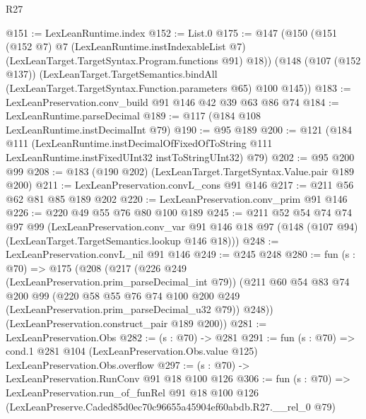 \begin{lexlean}{R27}
\begin{coremodule}
@151 := LexLeanRuntime.index
@152 := List.{0}
@175 := @147
    (@150
      (@151
        (@152 @7)
        @7
        (LexLeanRuntime.instIndexableList @7)
        (LexLeanTarget.TargetSyntax.Program.functions @91)
        @18))
    (@148
      (@107 (@152 @137))
      (LexLeanTarget.TargetSemantics.bindAll
        (LexLeanTarget.TargetSyntax.Function.parameters @65)
        @100
        @145))
@183 := LexLeanPreservation.conv_build @91 @146 @42 @39 @63 @86 @74
@184 := LexLeanRuntime.parseDecimal
@189 := @117 (@184 @108 LexLeanRuntime.instDecimalInt @79)
@190 := @95 @189
@200 := @121
    (@184
      @111
      (LexLeanRuntime.instDecimalOfFixedOfToString
        @111
        LexLeanRuntime.instFixedUInt32
        instToStringUInt32)
      @79)
@202 := @95 @200 @99
@208 := @183 (@190 @202) (LexLeanTarget.TargetSyntax.Value.pair @189 @200)
@211 := LexLeanPreservation.convL_cons @91 @146
@217 := @211 @56 @62 @81 @85 @189 @202
@220 := LexLeanPreservation.conv_prim @91 @146
@226 := @220 @49 @55 @76 @80 @100 @189
@245 := @211
    @52
    @54
    @74
    @74
    @97
    @99
    (LexLeanPreservation.conv_var
      @91
      @146
      @18
      @97
      (@148 (@107 @94) (LexLeanTarget.TargetSemantics.lookup @146 @18)))
@248 := LexLeanPreservation.convL_nil @91 @146
@249 := @245 @248
@280 := fun (s : @70) =>
  @175
    (@208
      (@217
        (@226 @249 (LexLeanPreservation.prim_parseDecimal_int @79))
        (@211
          @60
          @54
          @83
          @74
          @200
          @99
          (@220 @58 @55 @76 @74 @100 @200 @249 (LexLeanPreservation.prim_parseDecimal_u32 @79))
          @248))
      (LexLeanPreservation.construct_pair @189 @200))
@281 := LexLeanPreservation.Obs
@282 := (s : @70) -> @281
@291 := fun (s : @70) =>
  cond.{1} @281 @104 (LexLeanPreservation.Obs.value @125) LexLeanPreservation.Obs.overflow
@297 := (s : @70) -> LexLeanPreservation.RunConv @91 @18 @100 @126
@306 := fun (s : @70) =>
  LexLeanPreservation.run_of_funRel
    @91
    @18
    @100
    @126
    (LexLeanPreserve.Caded85d0ec70c96655a45904ef60abdb.R27.__rel_0 @79)
\end{coremodule}
\end{lexlean}
